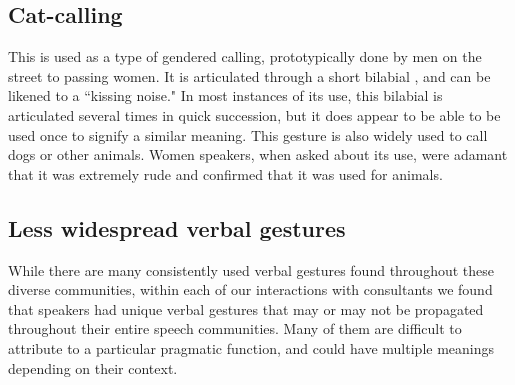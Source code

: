 \documentclass[output=paper
,newtxmath
,modfonts
,nonflat]{langsci/langscibook}
\begin{document}
\subsection{Cat-calling}

This  is used as a type of gendered calling, prototypically done by men on the street to passing women. It is articulated through a short bilabial , and can be likened to a ``kissing noise." In most instances of its use, this bilabial  is articulated several times in quick succession, but it does appear to be able to be used once to signify a similar meaning. This gesture is also widely used to call dogs or other animals. Women speakers, when asked about its use, were adamant that it was extremely rude and confirmed that it was used for animals. 





\subsection{Less widespread verbal gestures}\label{sec:pillion:less}
While there are many consistently used verbal gestures found throughout these diverse communities, within each of our interactions with consultants we found that speakers had unique verbal gestures that may or may not be propagated throughout their entire speech communities. Many of them are difficult to attribute to a particular pragmatic function, and could have multiple meanings depending on their context. 
\end{document}

